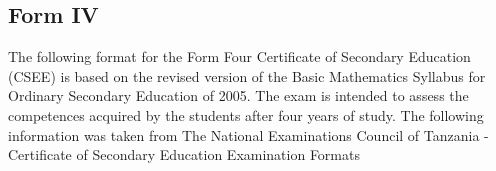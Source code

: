 
\subsection{Form IV}
\noindent The following format for the Form Four Certificate of Secondary Education (CSEE) is based on the revised version of the Basic Mathematics Syllabus for Ordinary Secondary Education of 2005. The exam is intended to assess the competences acquired by the students after four years of study. The following information was taken from The National Examinations Council of Tanzania - Certificate of Secondary Education Examination Formats %

